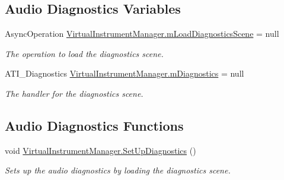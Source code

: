 \subsection*{Audio Diagnostics Variables}
\begin{DoxyCompactItemize}
\item 
\mbox{\label{group___virtual_instrument_manager_event_types_ga90c209c382663b4689a1a72f98b23d41}} 
Async\+Operation \hyperlink{group___virtual_instrument_manager_event_types_ga90c209c382663b4689a1a72f98b23d41}{Virtual\+Instrument\+Manager.\+m\+Load\+Diagnostics\+Scene} = null
\begin{DoxyCompactList}\small\item\em The operation to load the diagnostics scene. \end{DoxyCompactList}\item 
\mbox{\label{group___virtual_instrument_manager_event_types_ga61670e91d1470a1d9a57829ac35688f1}} 
A\+T\+I\+\_\+\+Diagnostics \hyperlink{group___virtual_instrument_manager_event_types_ga61670e91d1470a1d9a57829ac35688f1}{Virtual\+Instrument\+Manager.\+m\+Diagnostics} = null
\begin{DoxyCompactList}\small\item\em The handler for the diagnostics scene. \end{DoxyCompactList}\end{DoxyCompactItemize}
\subsection*{Audio Diagnostics Functions}
\begin{DoxyCompactItemize}
\item 
\mbox{\label{group___virtual_instrument_manager_event_types_ga3d7a09ee882f5d4d1f1e2ba2b2a7f65d}} 
void \hyperlink{group___virtual_instrument_manager_event_types_ga3d7a09ee882f5d4d1f1e2ba2b2a7f65d}{Virtual\+Instrument\+Manager.\+Set\+Up\+Diagnostics} ()
\begin{DoxyCompactList}\small\item\em Sets up the audio diagnostics by loading the diagnostics scene. \end{DoxyCompactList}\end{DoxyCompactItemize}


